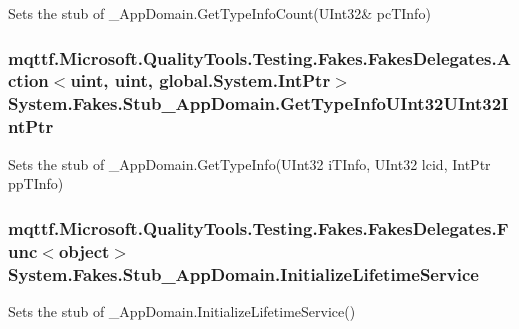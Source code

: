 Sets the stub of \-\_\-\-App\-Domain.\-Get\-Type\-Info\-Count(U\-Int32\& pc\-T\-Info)

\hypertarget{class_system_1_1_fakes_1_1_stub___app_domain_a998741b9b07c77c5caf1ff2bb3ea534e}{
\subsubsection[{Get\-Type\-Info\-U\-Int32\-U\-Int32\-Int\-Ptr}]{\setlength{\rightskip}{0pt plus 5cm}mqttf.\-Microsoft.\-Quality\-Tools.\-Testing.\-Fakes.\-Fakes\-Delegates.\-Action$<$uint, uint, global.\-System.\-Int\-Ptr$>$ System.\-Fakes.\-Stub\-\_\-\-App\-Domain.\-Get\-Type\-Info\-U\-Int32\-U\-Int32\-Int\-Ptr}}\label{class_system_1_1_fakes_1_1_stub___app_domain_a998741b9b07c77c5caf1ff2bb3ea534e}


Sets the stub of \-\_\-\-App\-Domain.\-Get\-Type\-Info(\-U\-Int32 i\-T\-Info, U\-Int32 lcid, Int\-Ptr pp\-T\-Info)

\hypertarget{class_system_1_1_fakes_1_1_stub___app_domain_ae3d95a932506a2838cd596b37ac20181}{
\subsubsection[{Initialize\-Lifetime\-Service}]{\setlength{\rightskip}{0pt plus 5cm}mqttf.\-Microsoft.\-Quality\-Tools.\-Testing.\-Fakes.\-Fakes\-Delegates.\-Func$<$object$>$ System.\-Fakes.\-Stub\-\_\-\-App\-Domain.\-Initialize\-Lifetime\-Service}}\label{class_system_1_1_fakes_1_1_stub___app_domain_ae3d95a932506a2838cd596b37ac20181}


Sets the stub of \-\_\-\-App\-Domain.\-Initialize\-Lifetime\-Service()


